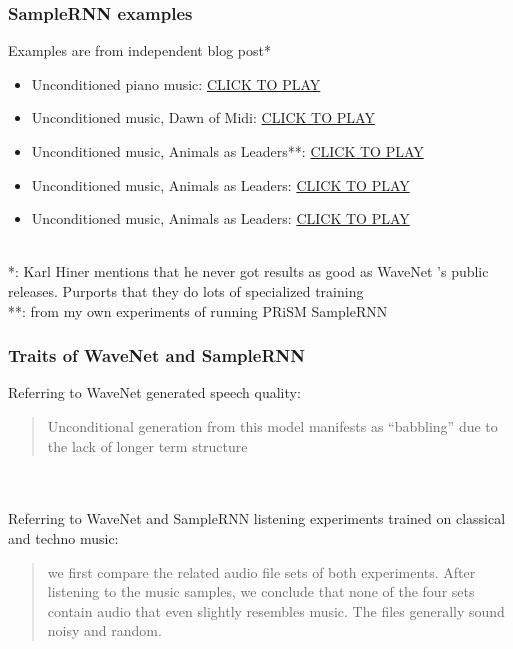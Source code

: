 \documentclass{beamer}
\begin{document}

\begin{frame}
	\frametitle{SampleRNN examples}
	Examples are from independent blog post*
	\begin{itemize}
		\item
			Unconditioned piano music: \href{run:./samplernn_sample_2.mp3}{CLICK TO PLAY}
		\item
			Unconditioned music, Dawn of Midi: \href{run:./samplernn_sample_1.mp3}{CLICK TO PLAY}
		\item
			Unconditioned music, Animals as Leaders**: \href{run:./aamgen_epoch_45.wav}{CLICK TO PLAY}
		\item
			Unconditioned music, Animals as Leaders: \href{run:./aamgen_epoch_75.wav}{CLICK TO PLAY}
		\item
			Unconditioned music, Animals as Leaders: \href{run:./aamgen_epoch_80.wav}{CLICK TO PLAY}
	\end{itemize}\ \\
	\vspace{1em}
	*: Karl Hiner mentions that he never got results as good as WaveNet 's public releases. Purports that they do lots of specialized training\\
	**: from my own experiments of running PRiSM SampleRNN
\end{frame}


\begin{frame}
	\frametitle{Traits of WaveNet and SampleRNN}
	Referring to WaveNet generated speech quality:
	\begin{quote}
		Unconditional generation from this model manifests as ``babbling'' due to the lack of longer term structure
	\end{quote}\\\ \\
	Referring to WaveNet and SampleRNN listening experiments trained on classical and techno music:
	\begin{quote}
		we first compare the related audio file sets of both experiments. After listening to the music samples, we conclude that none of the four sets contain audio that even slightly resembles music. The files generally sound noisy and random.
	\end{quote}
\end{frame}
\end{document}

